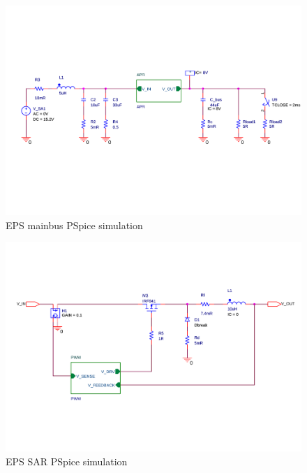 \begin{figure}
\centering
\includegraphics[scale=0.6]{figures/fig_CDR_PSpice_Mainbus}
\caption{\ac{EPS} mainbus PSpice simulation}
\label{fig:PSpice_mainbus}
\end{figure}
%
\begin{figure}
\centering
\includegraphics[scale=0.6]{figures/fig_CDR_PSpice_APR}
\caption{\ac{EPS} \ac{SAR} PSpice simulation}
\label{fig:PSpice_SAR}
\end{figure}
%
